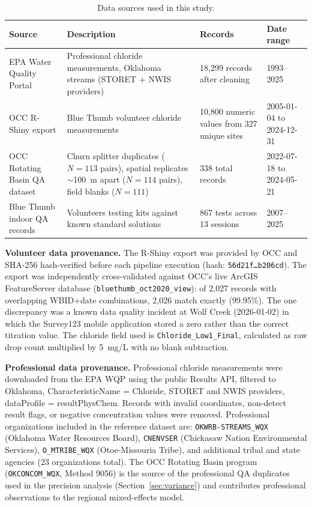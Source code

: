 \documentclass[lineno]{wlpeerj}
\begin{document}
\begin{table}[ht]
\centering
\caption{Data sources used in this study.}
\label{tab:datasources}
\begin{tabular}{p{3.5cm} p{5cm} p{2.5cm} p{2.5cm}}
\toprule
Source & Description & Records & Date range \\
\midrule
EPA Water Quality Portal & Professional chloride measurements, Oklahoma streams (STORET + NWIS providers) & 18,299 records after cleaning & 1993--2025 \\
OCC R-Shiny export & Blue Thumb volunteer chloride measurements & 10,800 numeric values from 327 unique sites & 2005-01-04 to 2024-12-31 \\
OCC Rotating Basin QA dataset & Churn splitter duplicates ($N=113$ pairs), spatial replicates $\sim$100~m apart ($N=114$ pairs), field blanks ($N=111$) & 338 total records & 2022-07-18 to 2024-05-21 \\
Blue Thumb indoor QA records & Volunteers testing kits against known standard solutions & 867 tests across 13 sessions & 2007--2025 \\
\bottomrule
\end{tabular}
\end{table}

\textbf{Volunteer data provenance.} The R-Shiny export was provided by OCC and SHA-256 hash-verified before each pipeline execution (hash: \texttt{56d21f\ldots b206cd}). The export was independently cross-validated against OCC's live ArcGIS FeatureServer database (\texttt{bluethumb\_oct2020\_view}): of 2,027 records with overlapping WBID+date combinations, 2,026 match exactly (99.95\%). The one discrepancy was a known data quality incident at Wolf Creek (2026-01-02) in which the Survey123 mobile application stored a zero rather than the correct titration value. The chloride field used is \texttt{Chloride\_Low1\_Final}, calculated as raw drop count multiplied by 5~mg/L with no blank subtraction.

\textbf{Professional data provenance.} Professional chloride measurements were downloaded from the EPA WQP using the public Results API, filtered to Oklahoma, CharacteristicName = Chloride, STORET and NWIS providers, dataProfile = resultPhysChem. Records with invalid coordinates, non-detect result flags, or negative concentration values were removed. Professional organizations included in the reference dataset are: \texttt{OKWRB-STREAMS\_WQX} (Oklahoma Water Resources Board), \texttt{CNENVSER} (Chickasaw Nation Environmental Services), \texttt{O\_MTRIBE\_WQX} (Otoe-Missouria Tribe), and additional tribal and state agencies (23 organizations total). The OCC Rotating Basin program (\texttt{OKCONCOM\_WQX}, Method 9056) is the source of the professional QA duplicates used in the precision analysis (Section~\ref{sec:variance}) and contributes professional observations to the regional mixed-effects model.
\end{document}
